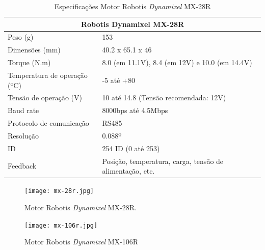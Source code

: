 \begin{table}[h!]
	\begin{tabular}{ll}
		\multicolumn{2}{c}{Robotis Dynamixel MX-28R}                                       \\ \hline
		Peso (g)                     & 153                                                      \\ \hline
		Dimensões (mm)               & 40.2 x 65.1 x 46                                         \\ \hline
		Torque (N.m)                 & 8.0 (em 11.1V), 8.4 (em 12V) e 10.0 (em 14.4V)           \\ \hline
		Temperatura de operação (ºC) & -5 até +80                                               \\ \hline
		Tensão de operação (V)       & 10 até 14.8 (Tensão recomendada: 12V)                    \\ \hline
		Baud rate                    & 8000bps até 4.5Mbps                                      \\ \hline
		Protocolo de comunicação     & RS485                                                    \\ \hline
		Resolução                    & 0.088º                                                   \\ \hline
		ID                           & 254 ID (0 até 253)                                       \\ \hline
		Feedback                     & Posição, temperatura, carga, tensão de alimentação, etc. \\ \hline
	\end{tabular}
	\caption{Especificações Motor Robotis\textit{ Dynamixel} MX-28R  }
\end{table}

\begin{figure}[h!]												
	\centering												
	\texttt{[image: mx-28r.jpg]}				
	\caption{Motor Robotis\textit{ Dynamixel} MX-28R.}		
	\label{img:mx28}
\end{figure}

\begin{figure}[h!]												
	\centering												
	\texttt{[image: mx-106r.jpg]}				
	\caption{Motor Robotis\textit{ Dynamixel} MX-106R}		
	\label{img:mx106}	
\end{figure}

